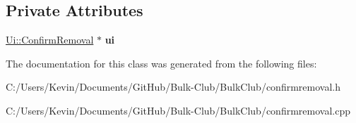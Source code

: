 \subsection*{Private Attributes}
\begin{DoxyCompactItemize}
\item 
\mbox{\label{class_confirm_removal_a6698373ca82cff894c0a299ed4bba11f}} 
\mbox{\hyperlink{class_ui_1_1_confirm_removal}{Ui\+::\+Confirm\+Removal}} $\ast$ {\bfseries ui}
\end{DoxyCompactItemize}


The documentation for this class was generated from the following files\+:\begin{DoxyCompactItemize}
\item 
C\+:/\+Users/\+Kevin/\+Documents/\+Git\+Hub/\+Bulk-\/\+Club/\+Bulk\+Club/confirmremoval.\+h\item 
C\+:/\+Users/\+Kevin/\+Documents/\+Git\+Hub/\+Bulk-\/\+Club/\+Bulk\+Club/confirmremoval.\+cpp\end{DoxyCompactItemize}
